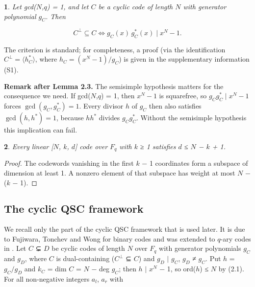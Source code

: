 \documentclass[pdflatex,sn-mathphys-num]{sn-jnl}
\theoremstyle{thmstyleone}
\newcommand{\thmxname}{}
\newtheorem*{thmxinner}{\thmxname}
\newenvironment{thmx}[1]{\renewcommand{\thmxname}{#1}\begin{thmxinner}}{\end{thmxinner}}
\theoremstyle{thmstylethree}
\begin{document}
\begin{thmx}{Lemma 2.3 (dual containment)}

Let gcd(\(N\),\(q\)) = 1, and let \(C\) be a cyclic code of length \(N\) with generator polynomial \(g_C\). Then

\[C^{\perp}\subseteq C \iff g_C(x)\,g_C^{*}(x)\mid x^N-1.\]

\end{thmx}

The criterion is standard; for completeness, a proof (via the identification \(C^{\perp}=\langle h_C^{*}\rangle\), where \(h_C=(x^N-1)/g_C\)) is given in the supplementary information (S1).

\textbf{Remark after Lemma 2.3.} The semisimple hypothesis matters for the consequence we need. If gcd(\(N\),\(q\)) = 1, then \(x^N-1\) is squarefree, so \(g_Cg_C^{*}\mid x^N-1\) forces \(\gcd(g_C,g_C^{*})=1\). Every divisor \(h\) of \(g_C\) then also satisfies \(\gcd(h,h^{*})=1\), because \(hh^{*}\) divides \(g_Cg_C^{*}\). Without the semisimple hypothesis this implication can fail.

\begin{thmx}{Lemma 2.4 (Singleton bound)}

Every linear {[}\(N\), \(k\), \(d\){]} code over \(F_q\) with \(k\) ≥ 1 satisfies \(d\) ≤ \(N\) − \(k\) + 1.

\end{thmx}

\begin{proof}[Proof]

The codewords vanishing in the first \(k\) − 1 coordinates form a subspace of dimension at least 1. A nonzero element of that subspace has weight at most \(N\) − (\(k\) − 1).

\end{proof}

\subsection{The cyclic QSC framework}

We recall only the part of the cyclic QSC framework that is used later. It is due to Fujiwara, Tonchev and Wong \cite{FTW} for binary codes and was extended to \(q\)-ary codes in \cite{XYY16,LM18}. Let \(C\) ⊊ \(D\) be cyclic codes of length \(N\) over \(F_q\) with generator polynomials \(g_C\) and \(g_D\), where \(C\) is dual-containing (\(C^⊥\) ⊆ \(C\)) and \(g_D\) \(\mid\) \(g_C\), \(g_D\) ≠ \(g_C\). Put \(h\) = \(g_C/g_D\) and \(k_C\) = dim \(C\) = \(N\) − deg \(g_C\); then \(h\) \(\mid\) \(x^N\) − 1, so ord(\(h\)) ≤ \(N\) by (2.1). For all non-negative integers \(a_l\), \(a_r\) with
\end{document}
